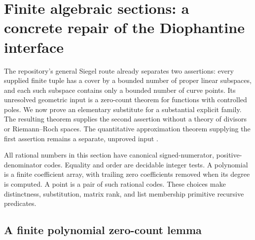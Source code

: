 \section{Finite algebraic sections: a concrete repair of the Diophantine interface}
\label{sec:finite-sections}

The repository's general Siegel route already separates two assertions:
every supplied finite tuple has a cover by a bounded number of proper
linear subspaces, and each such subspace contains only a bounded number
of curve points. Its unresolved geometric input is a zero-count theorem
for functions with controlled poles. We now prove an elementary substitute
for a substantial explicit family. The resulting theorem supplies the
second assertion without a theory of divisors or Riemann--Roch spaces.
The quantitative approximation theorem supplying the first assertion
remains a separate, unproved input \cite{repo-siegel}.

All rational numbers in this section have canonical signed-numerator,
positive-denominator codes. Equality and order are decidable integer
tests. A polynomial is a finite coefficient array, with trailing zero
coefficients removed when its degree is computed. A point is a pair of
such rational codes. These choices make distinctness, substitution,
matrix rank, and list membership primitive recursive predicates.

\subsection{A finite polynomial zero-count lemma}

